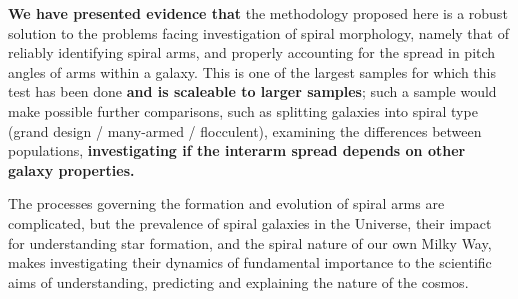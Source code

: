 \textbf{We have presented evidence that} the methodology proposed here is a robust solution to the problems facing investigation of spiral morphology, namely that of reliably identifying spiral arms, and properly accounting for the spread in pitch angles of arms within a galaxy. This is one of the largest samples for which this test has been done \textbf{and is scaleable to larger samples}; such a sample would make possible further comparisons, such as splitting galaxies into spiral type (grand design / many-armed / flocculent), examining the differences between populations, \textbf{investigating if the interarm spread depends on other galaxy properties.}

The processes governing the formation and evolution of spiral arms are complicated, but the prevalence of spiral galaxies in the Universe, their impact for understanding star formation, and the spiral nature of our own Milky Way, makes investigating their dynamics of fundamental importance to the scientific aims of understanding, predicting and explaining the nature of the cosmos.
